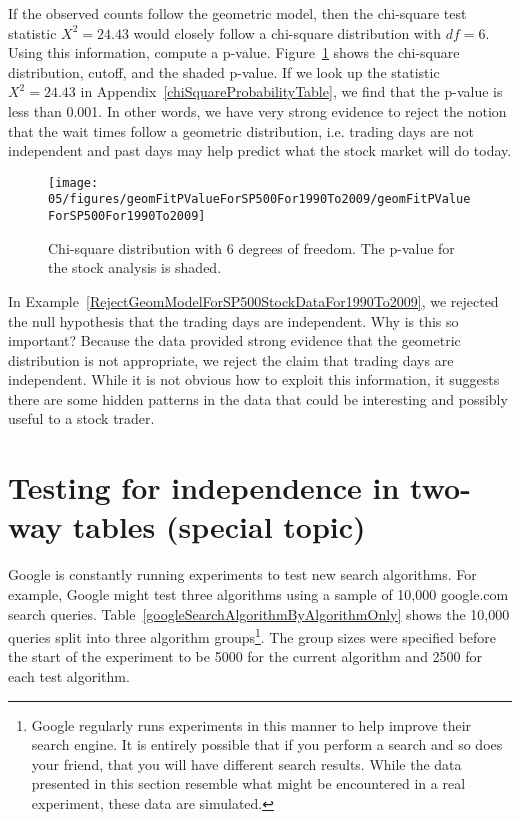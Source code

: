 \begin{example}{If the observed counts follow the geometric model, then the chi-square test statistic $X^2=24.43$ would closely follow a chi-square distribution with $df=6$. Using this information, compute a p-value.} \label{RejectGeomModelForSP500StockDataFor1990To2009}
Figure~\ref{geomFitPValueForSP500For1990To2009} shows the chi-square distribution, cutoff, and the shaded p-value. If we look up the statistic $X^2=24.43$ in Appendix~\ref{chiSquareProbabilityTable}, we find that the p-value is less than 0.001. In other words, we have very strong evidence to reject the notion that the wait times follow a geometric distribution, i.e. trading days are not independent and past days may help predict what the stock market will do today.
\end{example}

\begin{figure}[h]
\centering
\texttt{[image: 05/figures/geomFitPValueForSP500For1990To2009/geomFitPValueForSP500For1990To2009]}
\caption{Chi-square distribution with 6 degrees of freedom. The p-value for the stock analysis is shaded.}
\label{geomFitPValueForSP500For1990To2009}
\end{figure}

\begin{example}{In Example~\ref{RejectGeomModelForSP500StockDataFor1990To2009}, we rejected the null hypothesis that the trading days are independent. Why is this so important?}
Because the data provided strong evidence that the geometric distribution is not appropriate, we reject the claim that trading days are independent. While it is not obvious how to exploit this information, it suggests there are some hidden patterns in the data that could be interesting and possibly useful to a stock trader.
\end{example}

\section{Testing for independence in two-way tables (special topic)}
\label{twoWayTablesAndChiSquare}

Google is constantly running experiments to test new search algorithms. For example, Google might test three algorithms using a sample of 10,000 google.com search queries. Table~\ref{googleSearchAlgorithmByAlgorithmOnly} shows the 10,000 queries split into three algorithm groups\footnote{Google regularly runs experiments in this manner to help improve their search engine. It is entirely possible that if you perform a search and so does your friend, that you will have different search results. While the data presented in this section resemble what might be encountered in a real experiment, these data are simulated.}. The group sizes were specified before the start of the experiment to be 5000 for the current algorithm and 2500 for each test algorithm.

